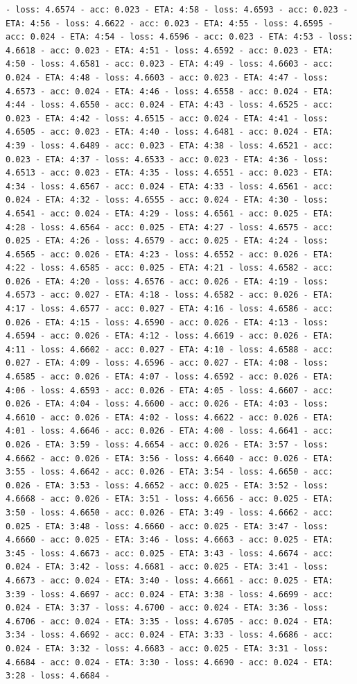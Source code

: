 \documentclass[11pt]{article}
\begin{document}
\begin{Verbatim}[commandchars=\\\{\}]
- loss: 4.6574 - acc: 0.023 - ETA: 4:58 - loss: 4.6593 - acc: 0.023 - ETA: 4:56 - loss: 4.6622 - acc: 0.023 - ETA: 4:55 - loss: 4.6595 - acc: 0.024 - ETA: 4:54 - loss: 4.6596 - acc: 0.023 - ETA: 4:53 - loss: 4.6618 - acc: 0.023 - ETA: 4:51 - loss: 4.6592 - acc: 0.023 - ETA: 4:50 - loss: 4.6581 - acc: 0.023 - ETA: 4:49 - loss: 4.6603 - acc: 0.024 - ETA: 4:48 - loss: 4.6603 - acc: 0.023 - ETA: 4:47 - loss: 4.6573 - acc: 0.024 - ETA: 4:46 - loss: 4.6558 - acc: 0.024 - ETA: 4:44 - loss: 4.6550 - acc: 0.024 - ETA: 4:43 - loss: 4.6525 - acc: 0.023 - ETA: 4:42 - loss: 4.6515 - acc: 0.024 - ETA: 4:41 - loss: 4.6505 - acc: 0.023 - ETA: 4:40 - loss: 4.6481 - acc: 0.024 - ETA: 4:39 - loss: 4.6489 - acc: 0.023 - ETA: 4:38 - loss: 4.6521 - acc: 0.023 - ETA: 4:37 - loss: 4.6533 - acc: 0.023 - ETA: 4:36 - loss: 4.6513 - acc: 0.023 - ETA: 4:35 - loss: 4.6551 - acc: 0.023 - ETA: 4:34 - loss: 4.6567 - acc: 0.024 - ETA: 4:33 - loss: 4.6561 - acc: 0.024 - ETA: 4:32 - loss: 4.6555 - acc: 0.024 - ETA: 4:30 - loss: 4.6541 - acc: 0.024 - ETA: 4:29 - loss: 4.6561 - acc: 0.025 - ETA: 4:28 - loss: 4.6564 - acc: 0.025 - ETA: 4:27 - loss: 4.6575 - acc: 0.025 - ETA: 4:26 - loss: 4.6579 - acc: 0.025 - ETA: 4:24 - loss: 4.6565 - acc: 0.026 - ETA: 4:23 - loss: 4.6552 - acc: 0.026 - ETA: 4:22 - loss: 4.6585 - acc: 0.025 - ETA: 4:21 - loss: 4.6582 - acc: 0.026 - ETA: 4:20 - loss: 4.6576 - acc: 0.026 - ETA: 4:19 - loss: 4.6573 - acc: 0.027 - ETA: 4:18 - loss: 4.6582 - acc: 0.026 - ETA: 4:17 - loss: 4.6577 - acc: 0.027 - ETA: 4:16 - loss: 4.6586 - acc: 0.026 - ETA: 4:15 - loss: 4.6590 - acc: 0.026 - ETA: 4:13 - loss: 4.6594 - acc: 0.026 - ETA: 4:12 - loss: 4.6619 - acc: 0.026 - ETA: 4:11 - loss: 4.6602 - acc: 0.027 - ETA: 4:10 - loss: 4.6588 - acc: 0.027 - ETA: 4:09 - loss: 4.6596 - acc: 0.027 - ETA: 4:08 - loss: 4.6585 - acc: 0.026 - ETA: 4:07 - loss: 4.6592 - acc: 0.026 - ETA: 4:06 - loss: 4.6593 - acc: 0.026 - ETA: 4:05 - loss: 4.6607 - acc: 0.026 - ETA: 4:04 - loss: 4.6600 - acc: 0.026 - ETA: 4:03 - loss: 4.6610 - acc: 0.026 - ETA: 4:02 - loss: 4.6622 - acc: 0.026 - ETA: 4:01 - loss: 4.6646 - acc: 0.026 - ETA: 4:00 - loss: 4.6641 - acc: 0.026 - ETA: 3:59 - loss: 4.6654 - acc: 0.026 - ETA: 3:57 - loss: 4.6662 - acc: 0.026 - ETA: 3:56 - loss: 4.6640 - acc: 0.026 - ETA: 3:55 - loss: 4.6642 - acc: 0.026 - ETA: 3:54 - loss: 4.6650 - acc: 0.026 - ETA: 3:53 - loss: 4.6652 - acc: 0.025 - ETA: 3:52 - loss: 4.6668 - acc: 0.026 - ETA: 3:51 - loss: 4.6656 - acc: 0.025 - ETA: 3:50 - loss: 4.6650 - acc: 0.026 - ETA: 3:49 - loss: 4.6662 - acc: 0.025 - ETA: 3:48 - loss: 4.6660 - acc: 0.025 - ETA: 3:47 - loss: 4.6660 - acc: 0.025 - ETA: 3:46 - loss: 4.6663 - acc: 0.025 - ETA: 3:45 - loss: 4.6673 - acc: 0.025 - ETA: 3:43 - loss: 4.6674 - acc: 0.024 - ETA: 3:42 - loss: 4.6681 - acc: 0.025 - ETA: 3:41 - loss: 4.6673 - acc: 0.024 - ETA: 3:40 - loss: 4.6661 - acc: 0.025 - ETA: 3:39 - loss: 4.6697 - acc: 0.024 - ETA: 3:38 - loss: 4.6699 - acc: 0.024 - ETA: 3:37 - loss: 4.6700 - acc: 0.024 - ETA: 3:36 - loss: 4.6706 - acc: 0.024 - ETA: 3:35 - loss: 4.6705 - acc: 0.024 - ETA: 3:34 - loss: 4.6692 - acc: 0.024 - ETA: 3:33 - loss: 4.6686 - acc: 0.024 - ETA: 3:32 - loss: 4.6683 - acc: 0.025 - ETA: 3:31 - loss: 4.6684 - acc: 0.024 - ETA: 3:30 - loss: 4.6690 - acc: 0.024 - ETA: 3:28 - loss: 4.6684 - 
\end{Verbatim}
\end{document}
